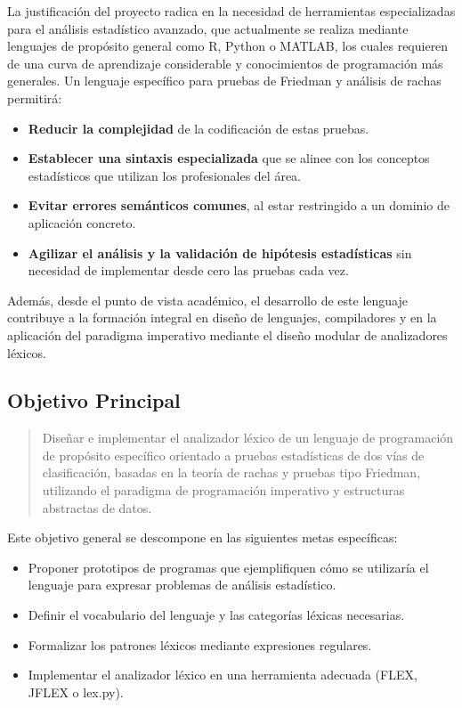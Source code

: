 \documentclass{article}
\begin{document}
La justificación del proyecto radica en la necesidad de herramientas especializadas para el análisis estadístico avanzado, que actualmente se realiza mediante lenguajes de propósito general como R, Python o MATLAB, los cuales requieren de una curva de aprendizaje considerable y conocimientos de programación más generales. Un lenguaje específico para pruebas de Friedman y análisis de rachas permitirá:

\begin{itemize}
  \item \textbf{Reducir la complejidad} de la codificación de estas pruebas.
  \item \textbf{Establecer una sintaxis especializada} que se alinee con los conceptos estadísticos que utilizan los profesionales del área.
  \item \textbf{Evitar errores semánticos comunes}, al estar restringido a un dominio de aplicación concreto.
  \item \textbf{Agilizar el análisis y la validación de hipótesis estadísticas} sin necesidad de implementar desde cero las pruebas cada vez.
\end{itemize}

Además, desde el punto de vista académico, el desarrollo de este lenguaje contribuye a la formación integral en diseño de lenguajes, compiladores y en la aplicación del paradigma imperativo mediante el diseño modular de analizadores léxicos.


\subsection{Objetivo Principal}

\begin{quote}
Diseñar e implementar el analizador léxico de un lenguaje de programación de propósito específico orientado a pruebas estadísticas de dos vías de clasificación, basadas en la teoría de rachas y pruebas tipo Friedman, utilizando el paradigma de programación imperativo y estructuras abstractas de datos.
\end{quote}

Este objetivo general se descompone en las siguientes metas específicas:

\begin{itemize}
  \item Proponer prototipos de programas que ejemplifiquen cómo se utilizaría el lenguaje para expresar problemas de análisis estadístico.
  \item Definir el vocabulario del lenguaje y las categorías léxicas necesarias.
  \item Formalizar los patrones léxicos mediante expresiones regulares.
  \item Implementar el analizador léxico en una herramienta adecuada (FLEX, JFLEX o lex.py).
\end{itemize}
\end{document}
